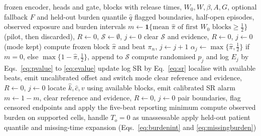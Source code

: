 \documentclass[preprint,12pt]{elsarticle}
\newcommand{\method}{CERA-CPD}
\newcommand{\1}{\mathbf{1}}
\begin{document}
\begin{algorithm}[!t]
\caption{Online operation of \method{} for one recording.}
\label{alg:cera}
\small
\begin{algorithmic}[1]
\Require frozen encoder, heads and gate, blocks with release times, $W_0,W,\beta,A,G$, optional fallback $F$ and held-out burden quantile $\hat q$
\Ensure flagged boundaries, half-open episodes, observed exposure and burden intervals
\State $m\gets\1\{\text{mean }\hat\pi\text{ of first }W_0\text{ blocks}\ge\tfrac12\}$ (pilot, then discarded), $R\gets0$, $\mathcal S\gets\emptyset$, $j\gets0$
    \State clear $\mathcal S$ and evidence, $R\gets0$, $j\gets0$ (mode kept)
  \EndIf
  \State compute frozen block $\hat\pi$ and beat $\pi_n$, $j\gets j+1$
  \State $\alpha_j\gets\max\{\hat\pi,\tfrac12\}$ if $m=0$, else $\max\{1-\hat\pi,\tfrac12\}$, append to $\mathcal S$
  \State compute randomised $p_j$ and log $E_j$ by Eqs.~\ref{eq:pvalue} to \ref{eq:evalue}
    \State update log SR by Eq.~\ref{eq:sr}
  \EndIf
    \State localise with available beats, emit uncalibrated offset and switch mode
    \State clear reference and evidence, $R\gets0$, $j\gets0$
    \State locate $\hat k,\hat c,v$ using available blocks, emit calibrated SR alarm
    \State $m\gets1-m$, clear reference and evidence, $R\gets0$, $j\gets0$
  \EndIf
\EndFor
\State pair boundaries, flag censored endpoints and apply the five-beat reporting minimum
\State compute observed burden on supported cells, handle $T_o=0$ as unassessable
\State apply held-out patient quantile and missing-time expansion (Eqs.~\ref{eq:burdenint} and \ref{eq:missingburden})
\end{algorithmic}

\end{algorithm}

\end{document}
